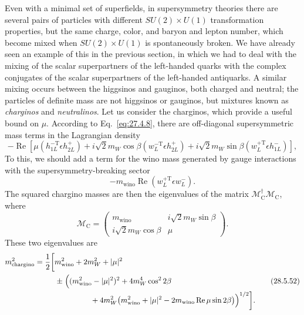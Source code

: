 Even with a minimal set of superfields, in supersymmetry theories there are
several pairs of particles with different \(SU(2)\times U(1)\)
transformation properties, but the same charge, color, and baryon and
lepton number, which become mixed when \(SU(2)\times U(1)\) is
spontaneously broken. We have already seen an example of this in the
previous section, in which we had to deal with the mixing of the scalar
superpartners of the left-handed quarks with the complex conjugates of the
scalar superpartners of the left-handed antiquarks. A similar mixing occurs
between the higgsinos and gauginos, both charged and neutral; the particles
of definite mass are not higgsinos or gauginos, but mixtures known as
\textit{charginos} and \textit{neutralinos}. Let us consider the charginos,
which provide a useful bound on \(\mu\). According to
Eq.~\eqref{eq:27.4.8}, there are off-diagonal supersymmetric mass terms in
the Lagrangian density
\[
  -\operatorname{Re}\left[
    \mu\left(h_{1L}^{-\mathrm T}\epsilon h_{2L}^+\right)
    +i\sqrt{2}m_W\cos\beta
      \left(w_L^{-\mathrm T}\epsilon h_{2L}^+\right)
    +i\sqrt{2}m_W\sin\beta
      \left(w_L^{+\mathrm T}\epsilon h_{1L}^-\right)
  \right],
\]
To this, we should add a term for the wino mass generated by gauge
interactions with the supersymmetry-breaking sector
\[
  -m_{\mathrm{wino}}\operatorname{Re}
    \left(w_L^{+\mathrm T}\epsilon w_L^-\right).
\]
The squared chargino masses are then the eigenvalues of the matrix
\(\mathcal{M}_{\mathrm C}^\dagger\mathcal{M}_{\mathrm C}\), where
\begin{equation}
  \mathcal{M}_{\mathrm C}
  =
  \begin{pmatrix}
    m_{\mathrm{wino}} & i\sqrt{2}m_W\sin\beta\\
    i\sqrt{2}m_W\cos\beta & \mu
  \end{pmatrix}.
  \tag{28.5.51}\label{eq:28.5.51}
\end{equation}
These two eigenvalues are
\begin{equation}
  \begin{aligned}
  m_{\mathrm{chargino}}^2
  =\frac12\biggl[
    &m_{\mathrm{wino}}^2+2m_W^2+|\mu|^2\\
    &\mathrel{\pm}\Bigl(
      (m_{\mathrm{wino}}^2-|\mu|^2)^2
      +4m_W^4\cos^22\beta\\
    &\hspace{4.7em}
      +4m_W^2\bigl(
        m_{\mathrm{wino}}^2+|\mu|^2
        -2m_{\mathrm{wino}}\operatorname{Re}\mu\sin2\beta
      \bigr)
    \Bigr)^{1/2}
  \biggr].
  \end{aligned}
  \tag{28.5.52}\label{eq:28.5.52}
\end{equation}
